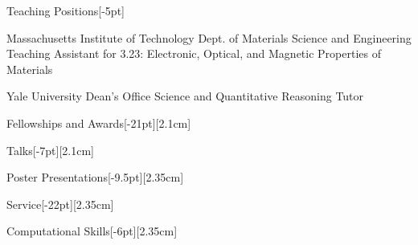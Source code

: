 \documentclass{cv} %
\begin{document}
\begin{cvSection}{Teaching Positions}[-5pt]
    
    {Massachusetts Institute of Technology}
    {Dept. of Materials Science and Engineering}
    {Teaching Assistant for 3.23: Electronic, Optical, and Magnetic Properties of Materials}
    
    {Yale University}
    {Dean's Office}
    {Science and Quantitative Reasoning Tutor}

\end{cvSection}

\vspace{-5mm}
\begin{cvSection}{Fellowships and Awards}[-21pt][2.1cm]
    
\end{cvSection}

\begin{pubsSection}[-7pt][2.1cm]
    
\end{pubsSection}


\begin{cvSection}{Talks}[-7pt][2.1cm]
    
\end{cvSection}

\begin{cvSection}{Poster Presentations}[-9.5pt][2.35cm]
    
\end{cvSection}

\begin{cvSection}{Service}[-22pt][2.35cm]
    
\end{cvSection}

\begin{cvSection}{Computational Skills}[-6pt][2.35cm]
\end{cvSection}
\end{document}
